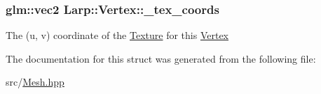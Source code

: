 \subsubsection[{\texorpdfstring{\+\_\+tex\+\_\+coords}{_tex_coords}}]{\setlength{\rightskip}{0pt plus 5cm}glm\+::vec2 Larp\+::\+Vertex\+::\+\_\+tex\+\_\+coords}\hypertarget{structLarp_1_1Vertex_aa3c59b04ad38f2861683c2784bc137fd}{}\label{structLarp_1_1Vertex_aa3c59b04ad38f2861683c2784bc137fd}
The (u, v) coordinate of the \hyperlink{classLarp_1_1Texture}{Texture} for this \hyperlink{structLarp_1_1Vertex}{Vertex} 

The documentation for this struct was generated from the following file\+:\begin{DoxyCompactItemize}
\item 
src/\hyperlink{Mesh_8hpp}{Mesh.\+hpp}\end{DoxyCompactItemize}
